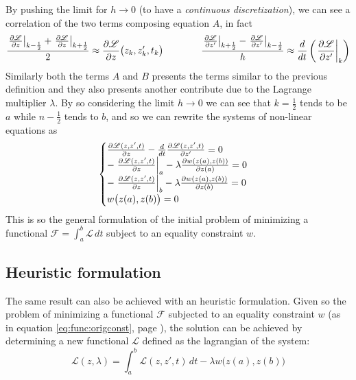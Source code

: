 	By pushing the limit for $h\rightarrow 0$ (to have a \textit{continuous discretization}), we can see a correlation of the two terms composing equation $A$, in fact
	\[	\dfrac{\left. \frac{\partial \mathscr L}{\partial z} \right|_{k - \frac 1 2} + \left. \frac{\partial \mathscr L}{\partial z} \right|_{k + \frac 1 2}}{2} \approx \frac{\partial \mathscr L}{\partial z} \big(z_k,z_k',t_k\big) \qquad \qquad  \dfrac{\left. \frac{\partial \mathscr L}{\partial z'} \right|_{k + \frac 1 2} - \left. \frac{\partial \mathscr L}{\partial z'} \right|_{k - \frac 1 2}}{h} \approx \frac d{dt} \left( \left. \frac{\partial \mathscr L}{\partial z'} \right|_k \right)  \]
	Similarly both the terms $A$ and $B$ presents the terms similar to the previous definition and they also presents another contribute due to the Lagrange multiplier $\lambda$. By so considering the limit $h\rightarrow 0$ we can see that $k=\frac 1 2$ tends to be $a$ while $n-\frac 1 2$ tends to $b$, and so we can rewrite the systems of non-linear equations as
	\[ \begin{cases}
		\frac{\partial \mathscr L (z,z',t)}{\partial z} - \frac d{dt} \frac{\partial \mathscr L(z,z',t)}{\partial z'} = 0 \\
		-\left.\frac{\partial \mathscr L(z,z',t)}{\partial z}\right|_a - \lambda \frac{\partial w(z(a),z(b))}{\partial z(a)} = 0 \\
		-\left.\frac{\partial \mathscr L(z,z',t)}{\partial z}\right|_b - \lambda \frac{\partial w(z(a),z(b))}{\partial z(b)} = 0 \\
		w\big(z(a),z(b)\big) = 0
	\end{cases} \]
	This is so the general formulation of the initial problem of minimizing a functional $\mathcal F = \int_a^b \mathcal L\, dt$  subject to an equality constraint $w$. 
	
	\subsection*{Heuristic formulation} 
	The same result can also be achieved with an heuristic formulation. Given so the problem of minimizing a functional $\mathcal F$ subjected to an equality constraint $w$ (as in equation \ref{eq:func:origconst}, page \pageref{eq:func:origconst}), the solution can be achieved by determining a new functional $\mathscr L$ defined as the lagrangian of the system:
	\begin{equation}
		\mathscr L(z,\lambda) = \int_a^b \mathcal L(z,z',t)\, dt - \lambda w\big(z(a),z(b)\big)
	\end{equation}
	
